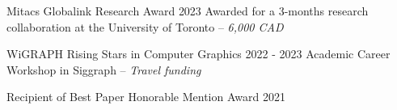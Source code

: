 

\begin{cventries}


  \cventry
    {Mitacs Globalink Research Award} %
    {2023} %
    {Awarded for a 3-months research collaboration at the University of Toronto -- \textit{6,000 CAD}} 

  \cventry
    {WiGRAPH Rising Stars in Computer Graphics} %
    {2022 - 2023} %
    {Academic Career Workshop in Siggraph -- \textit{Travel funding}} 

  \cventry
    {Recipient of Best Paper Honorable Mention Award} %
    {2021} %
    {
    } 

\end{cventries}
